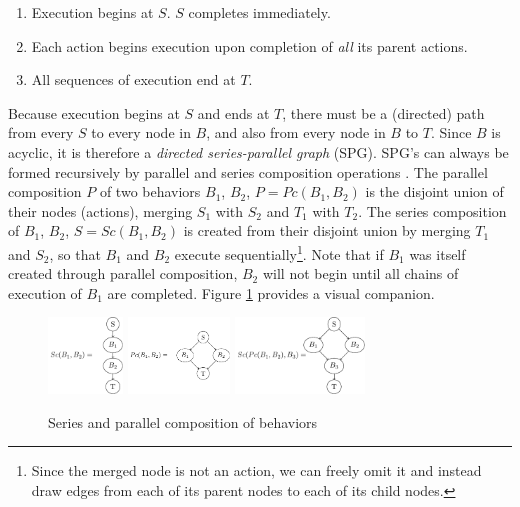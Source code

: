 \documentclass[conference]{IEEEtran}
\theoremstyle{definition}
\begin{document}
\begin{enumerate}
\item Execution begins at \(S\).  \(S\) completes immediately.
\item Each action begins execution upon completion of \textit{all} its parent actions.
\item All sequences of execution end at \(T\).
\end{enumerate}

Because execution begins at \(S\) and ends at \(T\), there must be a (directed)
path from every \(S\) to every node in \(B\), and also from every node in \(B\)
to \(T\). Since \(B\) is acyclic, it is therefore a \textit{directed series-parallel graph} (SPG).
SPG's can always be formed recursively by parallel and series composition
operations \cite{valdes1979recognition}. The parallel composition \(P\) of two behaviors \(B_1\),
\(B_2\), \(P = Pc(B_1, B_2)\) is the disjoint union of their nodes (actions),
merging \(S_1\) with \(S_2\) and \(T_1\) with \(T_2\). The series composition
of \(B_1\), \(B_2\), \(S = Sc(B_1, B_2)\) is created from their disjoint union
by merging \(T_1\) and \(S_2\), so that \(B_1\) and \(B_2\) execute
sequentially\footnote{Since the merged node is not an action, we can freely
omit it and instead draw edges from each of its parent nodes to each of its
child nodes.}.  Note that if \(B_1\) was itself created through parallel
composition, \(B_2\) will not begin until all chains of execution of \(B_1\)
are completed. Figure \ref{fig:graph-composition} provides a visual companion.

\begin{figure}
\begin{center}
\includegraphics[height=0.8in]{images/tikz/series.pdf}
\includegraphics[height=0.8in]{images/tikz/parallel.pdf} \vspace{0.in}
\includegraphics[height=0.8in]{images/tikz/parallel-and-series.pdf}
\end{center}
\caption{Series and parallel composition of behaviors }
\label{fig:graph-composition}
\end{figure}
\end{document}
